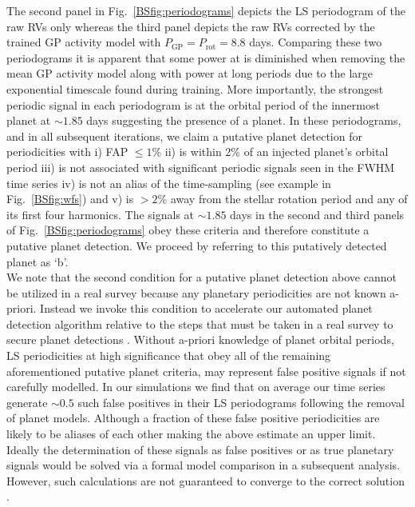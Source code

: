 The second panel in Fig.~\ref{BSfig:periodograms} depicts the LS periodogram of the raw RVs only whereas
the third panel depicts the raw RVs corrected by the trained GP activity model with
$P_{\text{GP}}=P_{\text{rot}}=8.8$ days. Comparing these two periodograms it is apparent
that some power at \prot{} is diminished when removing the mean GP activity model
along with power at long periods due to the large exponential
timescale found during training. More importantly, the strongest periodic signal in each periodogram is
at the orbital period of the innermost planet at $\sim 1.85$ days suggesting the presence of a
planet. In these periodograms, and in all subsequent iterations, we claim a putative planet detection
for periodicities with i) FAP $\leq 1$\% ii) is within 2\% of an injected planet's orbital period iii)
is not associated with significant
periodic signals seen in the FWHM time series iv) is not an alias of the time-sampling (see example in
Fig.~\ref{BSfig:wfs})
and v) is $>2$\% away from the stellar rotation period and any of its first four harmonics. The signals
at $\sim 1.85$ days in the second and third panels of Fig.~\ref{BSfig:periodograms} obey these criteria and
therefore constitute a putative planet detection. We proceed by referring to this putatively
detected planet as `b'. \\

We note that the second condition for a putative planet detection above cannot be utilized in a real survey
because any planetary periodicities are not known a-priori. Instead we invoke this condition to
accelerate our automated planet detection algorithm relative to the steps that must be taken in a real survey
to secure planet detections \citep[e.g. Bayesian model comparison;][]{ford07}.
Without a-priori knowledge of planet orbital periods, LS periodicities at high
significance that obey all of the remaining aforementioned putative planet criteria, may represent false positive
signals if not carefully modelled.
In our simulations we find that on average our time series generate $\sim 0.5$ such false positives in their LS
periodograms following the removal of planet models. Although
a fraction of these false positive periodicities are likely to be aliases of each other making the above
estimate an upper limit. Ideally the determination of these signals as false positives or as true planetary
signals would be solved via a formal model comparison in a subsequent analysis. However, such calculations are
not guaranteed to converge to the correct solution \citep[see][]{dumusque17}. \\

